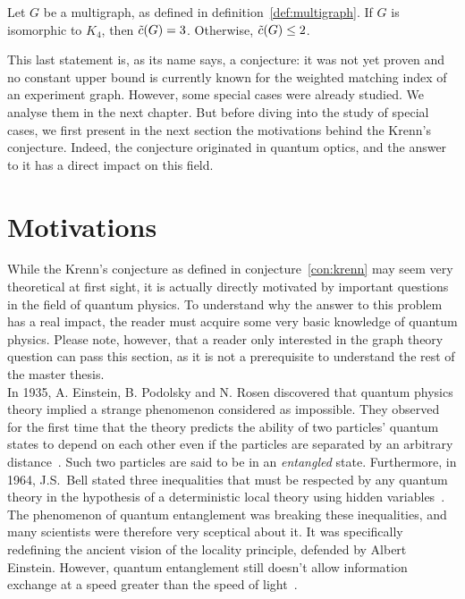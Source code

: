 \begin{conjecture}
    \label{con:krenn}
    Let $G$ be a multigraph, as defined in definition~\ref{def:multigraph}.
    If $G$ is isomorphic to $K_4$, then $\Tilde{c}(G) = 3$.
    Otherwise, $\Tilde{c}(G) \leq 2$.
\end{conjecture}

This last statement is, as its name says, a conjecture: it was not yet proven and no constant upper bound is currently known for the weighted matching index of an experiment graph.
However, some special cases were already studied.
We analyse them in the next chapter.
But before diving into the study of special cases, we first present in the next section the motivations behind the Krenn's conjecture.
Indeed, the conjecture originated in quantum optics, and the answer to it has a direct impact on this field.


\section{Motivations}
\label{sec:motivations}

While the Krenn's conjecture as defined in conjecture~\ref{con:krenn} may seem very theoretical at first sight, it is actually directly motivated by important questions in the field of quantum physics.
To understand why the answer to this problem has a real impact, the reader must acquire some very basic knowledge of quantum physics.
Please note, however, that a reader only interested in the graph theory question can pass this section, as it is not a prerequisite to understand the rest of the master thesis. \\

In 1935, A. Einstein, B. Podolsky and N. Rosen discovered that quantum physics theory implied a strange phenomenon considered as impossible.
They observed for the first time that the theory predicts the ability of two particles' quantum states to depend on each other even if the particles are separated by an arbitrary distance~\cite{EPR}.
Such two particles are said to be in an \textit{entangled} state.
Furthermore, in 1964, J.S.\ Bell stated three inequalities that must be respected by any quantum theory in the hypothesis of a deterministic local theory using hidden variables~\cite{bell1964}.
The phenomenon of quantum entanglement was breaking these inequalities, and many scientists were therefore very sceptical about it.
It was specifically redefining the ancient vision of the locality principle, defended by Albert Einstein.
However, quantum entanglement still doesn't allow information exchange at a speed greater than the speed of light~\cite{notFasterThanLight}.\\

